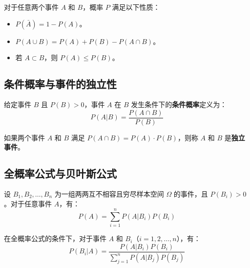 \documentclass[UTF8]{ctexart}
\begin{document}
	\begin{tcolorbox}[colback=fomula!5!white, colframe=fomula!75!black, title=概率的性质]
		对于任意两个事件 $A$ 和 $B$，概率 $P$ 满足以下性质：
		\begin{itemize}
			\item $P(\bar{A}) = 1 - P(A)$。
			\item $P(A \cup B) = P(A) + P(B) - P(A \cap B)$。
			\item 若 $A \subset B$，则 $P(A) \leq P(B)$。
		\end{itemize}
	\end{tcolorbox}
	
	\subsection{条件概率与事件的独立性}
	
	\begin{tcolorbox}[colback=definition!5!white, colframe=definition!75!black, title=条件概率]
		给定事件 $B$ 且 $P(B) > 0$，事件 $A$ 在 $B$ 发生条件下的\textbf{条件概率}定义为：
		\[
		P(A|B) = \frac{P(A \cap B)}{P(B)}
		\]
	\end{tcolorbox}
	
	\begin{tcolorbox}[colback=definition!5!white, colframe=definition!75!black, title=事件的独立性]
		如果两个事件 $A$ 和 $B$ 满足 $P(A \cap B) = P(A) \cdot P(B)$，则称 $A$ 和 $B$ 是\textbf{独立事件}。
	\end{tcolorbox}
	
	\subsection{全概率公式与贝叶斯公式}
	
	\begin{tcolorbox}[colback=definition!5!white, colframe=definition!75!black, title=全概率公式]
		设 $B_1, B_2, \dots, B_n$ 为一组两两互不相容且穷尽样本空间 $\Omega$ 的事件，且 $P(B_i) > 0$。对于任意事件 $A$，有：
		\[
		P(A) = \sum_{i=1}^n P(A | B_i) P(B_i)
		\]
	\end{tcolorbox}
	
	\begin{tcolorbox}[colback=definition!5!white, colframe=definition!75!black, title=贝叶斯公式]
		在全概率公式的条件下，对于事件 $A$ 和 $B_i$（$i = 1, 2, \dots, n$），有：
		\[
		P(B_i | A) = \frac{P(A | B_i) P(B_i)}{\sum_{j=1}^n P(A | B_j) P(B_j)}
		\]
	\end{tcolorbox}
	
\end{document}
